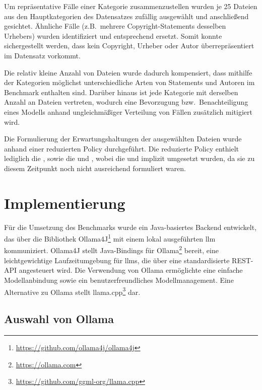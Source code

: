Um repräsentative Fälle einer Kategorie zusammenzustellen wurden je \num{25} Dateien aus den Hauptkategorien des Datensatzes zufällig ausgewählt und anschließend gesichtet.
Ähnliche Fälle (z.B.\ mehrere Copyright-Statements desselben Urhebers) wurden identifiziert und entsprechend ersetzt.
Somit konnte sichergestellt werden, dass kein Copyright, Urheber oder Autor überrepräsentiert im Datensatz vorkommt.

Die relativ kleine Anzahl von Dateien wurde dadurch kompensiert, dass mithilfe der Kategorien möglichst unterschiedliche Arten von Statements und Autoren im Benchmark enthalten sind.
Darüber hinaus ist jede Kategorie mit derselben Anzahl an Dateien vertreten, wodurch eine Bevorzugung bzw.\ Benachteiligung eines Modells anhand ungleichmäßiger Verteilung von Fällen zusätzlich mitigiert wird.

Die Formulierung der Erwartungshaltungen der ausgewählten Dateien wurde anhand einer reduzierten Policy durchgeführt.
Die reduzierte Policy enthielt lediglich die , sowie die  und , wobei die  und  implizit umgesetzt wurden, da sie zu diesem Zeitpunkt noch nicht ausreichend formuliert waren.


\section{Implementierung}\label{sec:benchmark-implementierung}

Für die Umsetzung des Benchmarks wurde ein Java-basiertes Backend entwickelt, das über die Bibliothek Ollama4J\footnote{\url{https://github.com/ollama4j/ollama4j}} mit einem lokal ausgeführten \gls{llm} kommuniziert.
Ollama4J stellt Java-Bindings für Ollama\footnote{\url{https://ollama.com}} bereit, eine leichtgewichtige Laufzeitumgebung für \glspl{llm}, die über eine standardisierte REST-API angesteuert wird.
Die Verwendung von Ollama ermöglichte eine einfache Modellanbindung sowie ein benutzerfreundliches Modellmanagement.
Eine Alternative zu Ollama stellt llama.cpp\footnote{\url{https://github.com/ggml-org/llama.cpp}} dar.


\subsection{Auswahl von Ollama}\label{subsec:auswahl-von-ollama}

